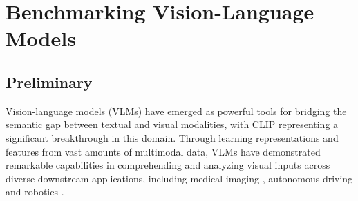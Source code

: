 \clearpage
\section{Benchmarking Vision-Language Models}
\label{sec:VLM}
\subsection{Preliminary}

Vision-language models (VLMs) have emerged as powerful tools for bridging the semantic gap between textual and visual modalities, with CLIP \cite{radford2021learning} representing a significant breakthrough in this domain. 
Through learning representations and features from vast amounts of multimodal data, VLMs have demonstrated remarkable capabilities in comprehending and analyzing visual inputs across diverse downstream applications, including medical imaging \cite{zhang2024generalist}, autonomous driving \cite{cui2024survey} and robotics \cite{gao2024physically}.


